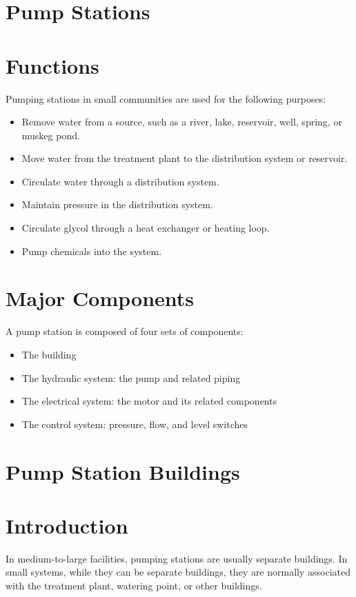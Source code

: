\documentclass[10pt]{article}
\begin{document}
\section{Pump Stations}
\section{Functions}
Pumping stations in small communities are used for the following purposes:

\begin{itemize}
  \item Remove water from a source, such as a river, lake, reservoir, well, spring, or muskeg pond.

  \item Move water from the treatment plant to the distribution system or reservoir.

  \item Circulate water through a distribution system.

  \item Maintain pressure in the distribution system.

  \item Circulate glycol through a heat exchanger or heating loop.

  \item Pump chemicals into the system.

\end{itemize}
\section{Major Components}
A pump station is composed of four sets of components:

\begin{itemize}
  \item The building

  \item The hydraulic system: the pump and related piping

  \item The electrical system: the motor and its related components

  \item The control system: pressure, flow, and level switches

\end{itemize}
\section{Pump Station Buildings}
\section{Introduction}
In medium-to-large facilities, pumping stations are usually separate buildings. In small systems, while they can be separate buildings, they are normally associated with the treatment plant, watering point, or other buildings.
\end{document}
